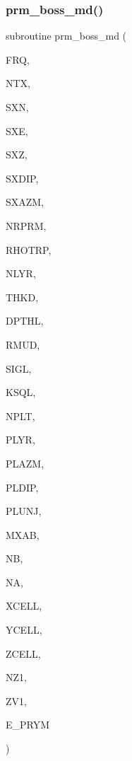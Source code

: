 \subsubsection{\texorpdfstring{prm\+\_\+boss\+\_\+md()}{prm\_boss\_md()}}
{\footnotesize\ttfamily subroutine prm\+\_\+boss\+\_\+md (\begin{DoxyParamCaption}\item[{real}]{F\+RQ,  }\item[{integer}]{N\+TX,  }\item[{real, dimension(ntx)}]{S\+XN,  }\item[{real, dimension(ntx)}]{S\+XE,  }\item[{real, dimension(ntx)}]{S\+XZ,  }\item[{real, dimension(ntx)}]{S\+X\+D\+IP,  }\item[{real, dimension(ntx)}]{S\+X\+A\+ZM,  }\item[{integer}]{N\+R\+P\+RM,  }\item[{real, dimension(nrprm)}]{R\+H\+O\+T\+RP,  }\item[{integer}]{N\+L\+YR,  }\item[{real(kind=ql), dimension(nlyr)}]{T\+H\+KD,  }\item[{real(kind=ql), dimension(nlyr)}]{D\+P\+T\+HL,  }\item[{real(kind=ql), dimension(0\+:nlyr)}]{R\+M\+UD,  }\item[{complex(kind=ql), dimension (nlyr)}]{S\+I\+GL,  }\item[{complex(kind=ql), dimension (nlyr)}]{K\+S\+QL,  }\item[{integer}]{N\+P\+LT,  }\item[{integer, dimension(nplt)}]{P\+L\+YR,  }\item[{real, dimension (nplt)}]{P\+L\+A\+ZM,  }\item[{real, dimension (nplt)}]{P\+L\+D\+IP,  }\item[{real, dimension (nplt)}]{P\+L\+U\+NJ,  }\item[{integer}]{M\+X\+AB,  }\item[{integer, dimension(nplt)}]{NB,  }\item[{integer, dimension(nplt)}]{NA,  }\item[{real, dimension(mxab,nplt)}]{X\+C\+E\+LL,  }\item[{real, dimension(mxab,nplt)}]{Y\+C\+E\+LL,  }\item[{real, dimension(mxab,nplt)}]{Z\+C\+E\+LL,  }\item[{integer}]{N\+Z1,  }\item[{real, dimension(nz1)}]{Z\+V1,  }\item[{complex, dimension(2,mxab,ntx,nplt)}]{E\+\_\+\+P\+R\+YM }\end{DoxyParamCaption})}

